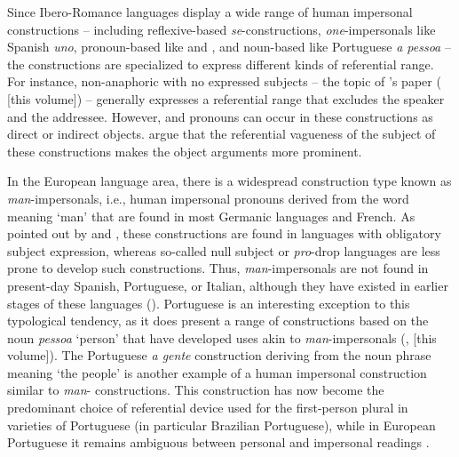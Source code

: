 \documentclass[output=paper]{langscibook}
\begin{document}
Since Ibero-Romance languages display a wide range of human impersonal constructions – including reflexive-based \textit{se}-constructions, \textit{one}-impersonals like Spanish \textit{uno},  pronoun-based like  and , and noun-based like Portuguese \textit{a pessoa} – the constructions are specialized to express different kinds of referential range. For instance, non-anaphoric  with no expressed subjects – the topic of \citeauthor{chapters/11-Pierre-De-Cock}’s paper (\citeyear{chapters/11-Pierre-De-Cock} [this volume]) – generally expresses a referential range that excludes the speaker and the addressee. However,  and  pronouns can occur in these constructions as direct or indirect objects. \citeauthor{chapters/11-Pierre-De-Cock} argue that the referential vagueness of the subject of these constructions makes the object arguments more prominent. 


\begin{sloppypar}
In the European language area, there is a widespread construction type known as \textit{man}-impersonals, i.e., human impersonal pronouns derived from the word meaning ‘man’ that are found in most Germanic languages and French. As pointed out by  \citet{GiacaloneRamatSansò2007} and \citet{SiewierskaPapastathi2011}, these constructions are found in languages with obligatory subject expression, whereas so-called null subject or \textit{pro}-drop languages are less prone to develop such constructions. Thus, \textit{man}-impersonals are not found in present-day Spanish, Portuguese, or Italian, although they have existed in earlier stages of these languages (\citealt{GiacaloneRamatSansò2007}). Portuguese is an interesting exception to this typological tendency, as it does present a range of constructions based on the noun \textit{pessoa}  ‘person’ that have developed uses akin to \textit{man}-impersonals (\citealt{DuarteMarques2014, Posio2017,Posio2021, AmaralMihatsch2019}, \citeyear{chapters/05-Amaral-Mihatsch} [this volume]). The Portuguese \textit{a gente}  construction deriving from the noun phrase meaning ‘the people’ is another example of a human impersonal construction similar to \textit{man}- constructions. This construction has now become the predominant choice of referential device used for the first-person plural in varieties of Portuguese (in particular Brazilian Portuguese), while in European Portuguese it remains ambiguous between personal and impersonal readings \citep{Posio2012}. 
\end{sloppypar}
\end{document}
